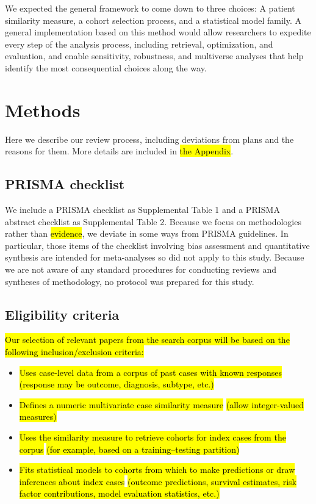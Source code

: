 \documentclass[sn-mathphys,Numbered,pdflatex]{sn-jnl}
\theoremstyle{remark}
\theoremstyle{definition}
\providecommand{\tightlist}{%
  \setlength{\itemsep}{0pt}\setlength{\parskip}{0pt}}
\begin{document}
We expected the general framework to come down to three choices: A
patient similarity measure, a cohort selection process, and a
statistical model family. A general implementation based on this method
would allow researchers to expedite every step of the analysis process,
including retrieval, optimization, and evaluation, and enable
sensitivity, robustness, and multiverse analyses that help identify the
most consequential choices along the way.

\section{Methods}\label{methods}

Here we describe our review process, including deviations from plans and
the reasons for them. More details are included in \hl{the Appendix}.

\subsection{PRISMA checklist}\label{prisma-checklist}

We include a PRISMA checklist as Supplemental Table 1 and a PRISMA
abstract checklist as Supplemental Table 2. Because we focus on
methodologies rather than\hl{ evidence}, we deviate in some ways from
PRISMA guidelines. In particular, those items of the checklist involving
bias assessment and quantitative synthesis are intended for
meta-analyses so did not apply to this study. Because we are not aware
of any standard procedures for conducting reviews and syntheses of
methodology, no protocol was prepared for this study.

\subsection{Eligibility criteria}\label{eligibility-criteria}

\hl{Our selection of relevant papers from the search corpus will be based on the following inclusion/exclusion criteria:}

\begin{itemize}
\tightlist
\item
  \hl{Uses case-level data from a corpus of past cases with known responses}\newline
  \hl{(response may be outcome, diagnosis, subtype, etc.)}
\item
  \hl{Defines a numeric multivariate case similarity measure}\newline
  \hl{(allow integer-valued measures)}
\item
  \hl{Uses the similarity measure to retrieve cohorts for index cases from the corpus}\newline
  \hl{(for example, based on a training--testing partition)}
\item
  \hl{Fits statistical models to cohorts from which to make predictions or draw inferences about index cases}\newline
  \hl{(outcome predictions, survival estimates, risk factor contributions, model evaluation statistics, etc.)}
\end{itemize}
\end{document}
